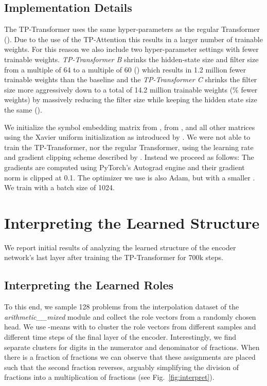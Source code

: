\documentclass[11pt,a4paper]{article}
\newcommand{\ischl}[1]{{#1}}
\begin{document}
\subsection{Implementation Details}
\label{sec:ImplsDetails}
\ischl{The TP-Transformer uses the same hyper-parameters as the regular Transformer (). 
Due to the use of the TP-Attention this results in a larger number of trainable weights. 
For this reason we also include two hyper-parameter settings with fewer trainable weights.
\textit{TP-Transformer B} shrinks the hidden-state size and filter size from a multiple of 64 to a multiple of 60 () which results in 1.2 million fewer trainable weights than the baseline and the \textit{TP-Transformer C} shrinks the filter size more aggressively down to a total of 14.2 million trainable weights (\texttildelow 32\% fewer weights) by massively reducing the filter size while keeping the hidden state size the same ().}

We initialize the symbol embedding matrix  from ,  from , and all other matrices  using the Xavier uniform initialization as introduced by \cite{glorot2010understanding}.
We were not able to train the TP-Transformer, nor the regular Transformer, using the learning rate and gradient clipping scheme described by \cite{saxton2018analysing}.
Instead we proceed as follows:
The gradients are computed using PyTorch's Autograd engine and their gradient norm is clipped at 0.1.
The optimizer we use is also Adam, but with a smaller .
We train with a batch size of 1024.

\section{Interpreting the Learned Structure}  \label{sec:Interp}
We report initial results of analyzing the learned structure of the encoder network's last layer after training the TP-Transformer for 700k steps.

\subsection{Interpreting the Learned Roles}
To this end, we sample 128 problems from the interpolation dataset of the \textit{arithmetic\_\_mixed} module and collect the role vectors from a randomly chosen head. 
We use -means with  to cluster the role vectors from different samples and different time steps of the final layer of the encoder. 
Interestingly, we find separate clusters for digits in the numerator and denominator of fractions. 
When there is a fraction of fractions we can observe that these assignments are placed such that the second fraction reverses, arguably simplifying the division of fractions into a multiplication of fractions (see Fig.~\ref{fig:interpret}). 
\end{document}
